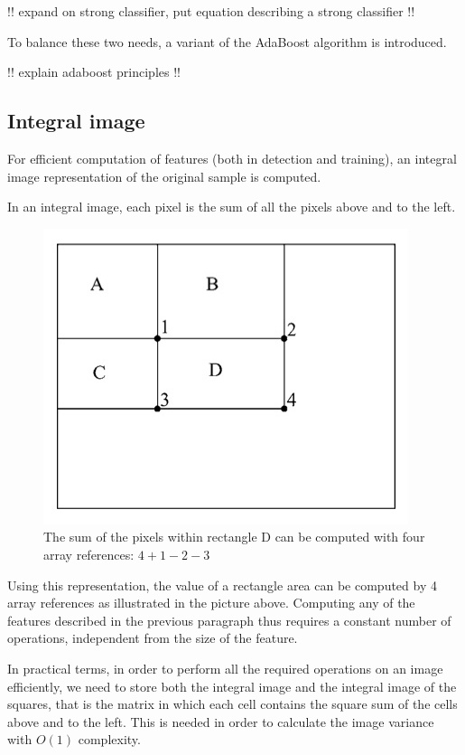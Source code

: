 \documentclass[a4paper,11pt,titlepage]{article}
\begin{document}
!! expand on strong classifier, put equation describing a strong classifier !!

To balance these two needs, a variant of the AdaBoost algorithm is introduced.

!! explain adaboost principles !!

\subsection{Integral image}
For efficient computation of features (both in detection and training), an
integral image representation of the original sample is computed.

In an integral image, each pixel is the sum of all the pixels above and to the
left.

\begin{figure}[h]
  \centering
  \includegraphics[scale=0.5]{area_sum_integral_image.jpg}
  \caption{The sum of the pixels within rectangle D can be computed with four
  array references: $4+1-2-3$}
  \label{fig:area_sum}
\end{figure}

Using this representation, the value of a rectangle area can be computed by 4
array references as illustrated in the picture above. Computing any of the
features described in the previous paragraph thus requires a constant number of
operations, independent from the size of the feature.

In practical terms, in order to perform all the required operations on an image
efficiently, we need to store both the integral image and the integral image of
the squares, that is the matrix in which each cell contains the square sum of
the cells above and to the left. This is needed in order to calculate the image
variance with $O(1)$ complexity.
\end{document}
